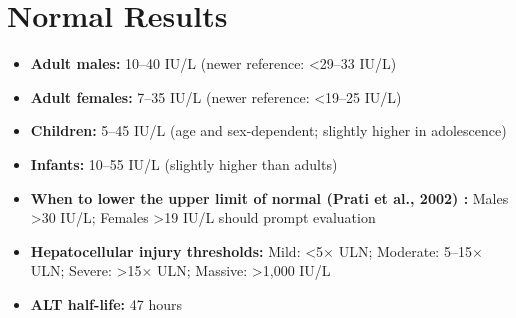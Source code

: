 \section*{Normal Results}
\begin{itemize}
  \item \textbf{Adult males:} 10--40 IU/L (newer reference: <29--33 IU/L)
  \item \textbf{Adult females:} 7--35 IU/L (newer reference: <19--25 IU/L)
  \item \textbf{Children:} 5--45 IU/L (age and sex-dependent; slightly higher in adolescence)
  \item \textbf{Infants:} 10--55 IU/L (slightly higher than adults)
  \item \textbf{When to lower the upper limit of normal (Prati et al., 2002) \cite{prati2002updated}:} Males >30 IU/L; Females >19 IU/L should prompt evaluation
  \item \textbf{Hepatocellular injury thresholds:} Mild: <5$\times$ ULN; Moderate: 5--15$\times$ ULN; Severe: >15$\times$ ULN; Massive: >1,000 IU/L
  \item \textbf{ALT half-life:} 47 hours
\end{itemize}

